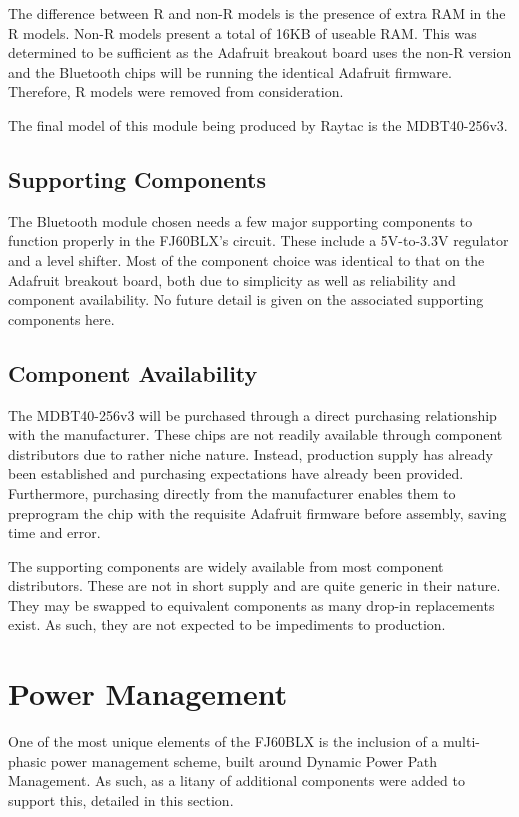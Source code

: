 \documentclass[11pt]{article}
\begin{document}
The difference between R and non-R models is the presence of extra RAM in the R models. Non-R models present a total of 16KB of useable RAM. This was determined to be sufficient as the Adafruit breakout board uses the non-R version and the Bluetooth chips will be running the identical Adafruit firmware. Therefore, R models were removed from consideration. 

The final model of this module being produced by Raytac is the MDBT40-256v3.

\subsection{Supporting Components}

The Bluetooth module chosen needs a few major supporting components to function properly in the FJ60BLX's circuit. These include a 5V-to-3.3V regulator and a level shifter. Most of the component choice was identical to that on the Adafruit breakout board, both due to simplicity as well as reliability and component availability. No future detail is given on the associated supporting components here.

\subsection{Component Availability}

The MDBT40-256v3 will be purchased through a direct purchasing relationship with the manufacturer. These chips are not readily available through component distributors due to rather niche nature. Instead, production supply has already been established and purchasing expectations have already been provided. Furthermore, purchasing directly from the manufacturer enables them to preprogram the chip with the requisite Adafruit firmware before assembly, saving time and error.

The supporting components are widely available from most component distributors. These are not in short supply and are quite generic in their nature. They may be swapped to equivalent components as many drop-in replacements exist. As such, they are not expected to be impediments to production.

\section{Power Management}

One of the most unique elements of the FJ60BLX is the inclusion of a multi-phasic power management scheme, built around Dynamic Power Path Management.\footnotemark {} As such, as a litany of additional components were added to support this, detailed in this section.
\end{document}
